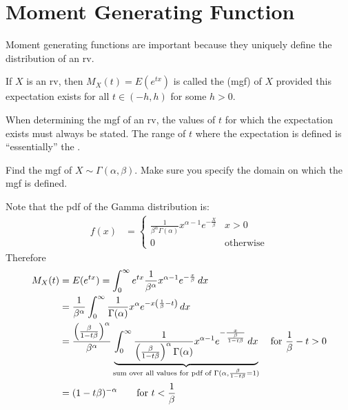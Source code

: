 \documentclass[notoc,notitlepage]{tufte-book}
\begin{document}


\section{Moment Generating Function}
\label{sec:moment_generating_function}

Moment generating functions are important because they uniquely define the distribution of an rv.

\begin{defn}\label{defn:moment_generating_function}
  If $X$ is an rv, then $M_X (t) = E(e^{tx})$ is called the  (mgf) of $X$ provided this expectation exists for all $t \in (-h , h)$ for some $h > 0$.
\end{defn}

\begin{note}
  When determining the mgf of an rv, the values of $t$ for which the expectation exists must always be stated. The range of $t$ where the expectation is defined is ``essentially'' the .
\end{note}

\begin{ex}
  Find the mgf of $X \sim \Gamma(\alpha, \beta)$. Make sure you specify the domain on which the mgf is defined.

  \begin{solution}
    Note that the pdf of the Gamma distribution is:
    \begin{align*}
      f(x) &= \begin{cases}
        \frac{1}{\beta^\alpha \Gamma(\alpha)} x^{\alpha - 1} e^{- \frac{X}{\beta} } & x > 0 \\
        0 & \text{otherwise}
      \end{cases}
    \end{align*}
    Therefore
    \begin{align*}
      M_X (t) &= E(e^{tx})
        = \int_{0}^{\infty}e^{tx} \frac{1}{\beta^\alpha} x^{\alpha - 1} e^{- \frac{x}{\beta}} \mathop{}\!d{x} \\
        &= \frac{1}{\beta^\alpha} \int_{0}^{\infty}  \frac{1}{\Gamma( \alpha )} x^{\alpha} e^{-x \left(\frac{1}{\beta} - t \right)} \mathop{}\!d{x} \\
        &= \frac{\left( \frac{\beta}{1 - t\beta} \right)^\alpha}{\beta^\alpha} \underbrace{ \int_{0}^{\infty} \frac{1}{\left( \frac{\beta}{1 - t \beta} \right)^\alpha \Gamma(\alpha)} x^{\alpha - 1} e^{-\frac{x}{\frac{\beta}{1 - t \beta}}} \mathop{}\!d{x} }_{\text{sum over all values for pdf of } \Gamma(\alpha, \frac{\beta}{1 - t \beta} = 1)} \quad \text{for } \frac{1}{\beta} - t > 0 \\
        &= (1 - t \beta)^{- \alpha} \qquad \text{for } t < \frac{1}{\beta}
    \end{align*}
  \end{solution}
\end{ex}
\end{document}
